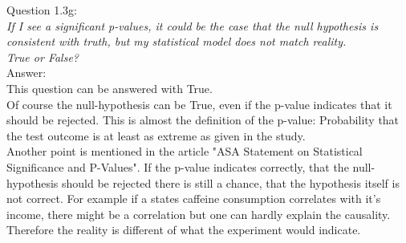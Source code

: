 
Question 1.3g:\\	
\textsl{If I see a significant p-values, it could be the case that the null hypothesis is consistent with truth, but my statistical model does not match reality.}\\
	
\textsl{True or False?}\\

Answer:\\
This question can be answered with True.\\

Of course the null-hypothesis can be True, even if the p-value indicates that it should be rejected. This is almost the definition of the p-value: Probability that the test outcome is at least as extreme as given in the study.\\

Another point is mentioned in the article "ASA Statement on Statistical Significance and P-Values". If the p-value indicates correctly, that the null-hypothesis should be rejected there is still a chance, that the hypothesis itself is not correct. For example if a states caffeine consumption correlates with it's income, there might be a correlation but one can hardly explain the causality. Therefore the reality is different of what the experiment would indicate.\\

